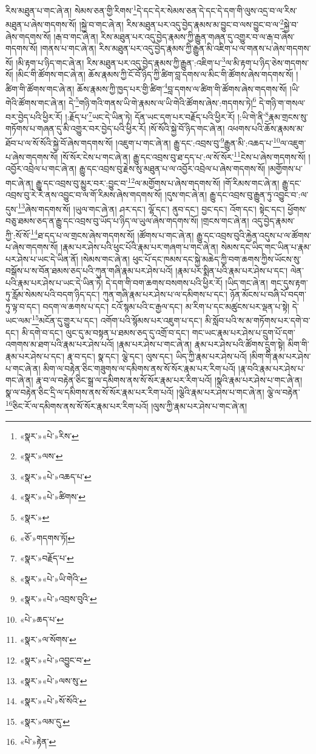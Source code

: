 རིས་མཐུན་པ་གང་ཞེ་ན། སེམས་ཅན་གྱི་རིགས་\footnote{«སྣར་»«པེ་»རིས་}དེ་དང་དེར་སེམས་ཅན་དེ་དང་དེ་དག་གི་ལུས་འདྲ་བ་ལ་རིས་མཐུན་པ་ཞེས་གདགས་སོ། །སྐྱེ་བ་གང་ཞེ་ན། རིས་མཐུན་པར་འདུ་བྱེད་རྣམས་མ་བྱུང་བ་ལས་བྱུང་བ་ལ་\footnote{«སྣར་»ལས་}སྐྱེ་བ་ཞེས་གདགས་སོ། །རྒ་བ་གང་ཞེ་ན། རིས་མཐུན་པར་འདུ་བྱེད་རྣམས་ཀྱི་རྒྱུན་གཞན་དུ་འགྱུར་བ་ལ་རྒ་བ་ཞེས་གདགས་སོ། །གནས་པ་གང་ཞེ་ན། རིས་མཐུན་པར་འདུ་བྱེད་རྣམས་ཀྱི་རྒྱུན་མི་འཇིག་པ་ལ་གནས་པ་ཞེས་གདགས་སོ། །མི་རྟག་པ་ཉིད་གང་ཞེ་ན། རིས་མཐུན་པར་འདུ་བྱེད་རྣམས་ཀྱི་རྒྱུན་:འཇིག་པ་\footnote{«སྣར་»«པེ་»འཆད་པ་}ལ་མི་རྟག་པ་ཉིད་ཅེས་གདགས་སོ། །མིང་གི་ཚོགས་གང་ཞེ་ན། ཆོས་རྣམས་ཀྱི་ངོ་བོ་ཉིད་ཀྱི་ཚིག་བླ་དགས་ལ་མིང་གི་ཚོགས་ཞེས་གདགས་སོ། །ཚིག་གི་ཚོགས་གང་ཞེ་ན། ཆོས་རྣམས་ཀྱི་ཁྱད་པར་གྱི་ཚིག་\footnote{«སྣར་»«པེ་»ཚིགས་}བླ་དགས་ལ་ཚིག་གི་ཚོགས་ཞེས་གདགས་སོ། །ཡི་གེའི་ཚོགས་གང་ཞེ་ན། དེ་\footnote{«སྣར་»}གཉི་གའི་གནས་ཡི་གེ་རྣམས་ལ་ཡི་གེའི་ཚོགས་ཞེས་:གདགས་ཏེ།\footnote{«ཅོ་»གདགས་ཏོ།} དེ་གཉི་ག་གསལ་བར་བྱེད་པའི་ཕྱིར་རོ། །:རྗོད་པ་\footnote{«སྣར་»བརྗོད་པ་}ཡང་དེ་ཡིན་ཏེ། དོན་ཡང་དག་པར་བརྗོད་པའི་ཕྱིར་རོ། །:ཡི་གེ་ནི་\footnote{«སྣར་»«པེ་»ཡི་གེའི་}རྣམ་གྲངས་སུ་གཏོགས་པ་གཞན་དུ་མི་འགྱུར་བར་བྱེད་པའི་ཕྱིར་རོ། །སོ་སོའི་སྐྱེ་བོ་ཉིད་གང་ཞེ་ན། འཕགས་པའི་ཆོས་རྣམས་མ་ཐོབ་པ་ལ་སོ་སོའི་སྐྱེ་བོ་ཞེས་གདགས་སོ། །འཇུག་པ་གང་ཞེ་ན། རྒྱུ་དང་:འབྲས་བུ་\footnote{«སྣར་»«པེ་»འབྲས་བུའི་}རྒྱུན་མི་:འཆད་པ་\footnote{«པེ་»ཆད་པ་}ལ་འཇུག་པ་ཞེས་གདགས་སོ། །སོ་སོར་ངེས་པ་གང་ཞེ་ན། རྒྱུ་དང་འབྲས་བུ་ཐ་དད་པ་:ལ་སོ་སོར་\footnote{«སྣར་»ལ་སོགས་}ངེས་པ་ཞེས་གདགས་སོ། །འབྱོར་འབྲེལ་པ་གང་ཞེ་ན། རྒྱུ་དང་འབྲས་བུ་རྗེས་སུ་མཐུན་པ་ལ་འབྱོར་འབྲེལ་པ་ཞེས་གདགས་སོ། །མགྱོགས་པ་གང་ཞེ་ན། རྒྱུ་དང་འབྲས་བུ་མྱུར་བར་:བྱུང་བ་\footnote{«སྣར་»«པེ་»འབྱུང་བ་}ལ་མགྱོགས་པ་ཞེས་གདགས་སོ། །གོ་རིམས་གང་ཞེ་ན། རྒྱུ་དང་འབྲས་བུ་རེ་རེ་ནས་འབྱུང་བ་ལ་གོ་རིམས་ཞེས་གདགས་སོ། །དུས་གང་ཞེ་ན། རྒྱུ་དང་འབྲས་བུ་རྒྱུན་ཏུ་འབྱུང་བ་:ལ་དུས་\footnote{«སྣར་»«པེ་»ལས་སུ་}ཞེས་གདགས་སོ། །ཡུལ་གང་ཞེ་ན། ཤར་དང་། ལྷོ་དང་། ནུབ་དང་། བྱང་དང་། འོག་དང་། སྟེང་དང་། ཕྱོགས་བཅུ་ཐམས་ཅད་ན་རྒྱུ་དང་འབྲས་བུ་ཡོད་པ་ཉིད་ལ་ཡུལ་ཞེས་གདགས་སོ། །གྲངས་གང་ཞེ་ན། འདུ་བྱེད་རྣམས་ཀྱི་:སོ་སོ་\footnote{«སྣར་»«པེ་»སོ་སོའི་}ཐ་དད་པ་ལ་གྲངས་ཞེས་གདགས་སོ། །ཚོགས་པ་གང་ཞེ་ན། རྒྱུ་དང་འབྲས་བུའི་རྐྱེན་འདུས་པ་ལ་ཚོགས་པ་ཞེས་གདགས་སོ། །རྣམ་པར་ཤེས་པའི་ཕུང་པོའི་རྣམ་པར་གཞག་པ་གང་ཞེ་ན། སེམས་དང་ཡིད་གང་ཡིན་པ་རྣམ་པར་ཤེས་པ་ཡང་དེ་ཡིན་ནོ། །སེམས་གང་ཞེ་ན། ཕུང་པོ་དང་ཁམས་དང་སྐྱེ་མཆེད་ཀྱི་བག་ཆགས་ཀྱིས་ཡོངས་སུ་བསྒོས་པ་ས་བོན་ཐམས་ཅད་པའི་ཀུན་གཞི་རྣམ་པར་ཤེས་པའོ། །རྣམ་པར་སྨིན་པའི་རྣམ་པར་ཤེས་པ་དང་། ལེན་པའི་རྣམ་པར་ཤེས་པ་ཡང་དེ་ཡིན་ཏེ། དེ་དག་གི་བག་ཆགས་བསགས་པའི་ཕྱིར་རོ། །ཡིད་གང་ཞེ་ན། གང་དུས་རྟག་ཏུ་རློམ་སེམས་པའི་བདག་ཉིད་དང་། ཀུན་གཞི་རྣམ་པར་ཤེས་པ་ལ་དམིགས་པ་དང་། ཉོན་མོངས་པ་བཞི་པོ་བདག་ཏུ་ལྟ་བ་དང་། བདག་ལ་ཆགས་པ་དང་། ངའོ་སྙམ་པའི་ང་རྒྱལ་དང་། མ་རིག་པ་དང་མཚུངས་པར་ལྡན་པ་སྟེ། དེ་ཡང་ལམ་\footnote{«སྣར་»ལམ་དུ་}མངོན་དུ་གྱུར་པ་དང་། འགོག་པའི་སྙོམས་པར་འཇུག་པ་དང་། མི་སློབ་པའི་ས་མ་གཏོགས་པར་དགེ་བ་དང་། མི་དགེ་བ་དང་། ལུང་དུ་མ་བསྟན་པ་ཐམས་ཅད་དུ་འགྲོ་བ་དང་། གང་ཡང་རྣམ་པར་ཤེས་པ་དྲུག་པོ་དག་འགགས་མ་ཐག་པའི་རྣམ་པར་ཤེས་པའོ། །རྣམ་པར་ཤེས་པ་གང་ཞེ་ན། རྣམ་པར་ཤེས་པའི་ཚོགས་དྲུག་སྟེ། མིག་གི་རྣམ་པར་ཤེས་པ་དང་། རྣ་བ་དང་། སྣ་དང་། ལྕེ་དང་། ལུས་དང་། ཡིད་ཀྱི་རྣམ་པར་ཤེས་པའོ། །མིག་གི་རྣམ་པར་ཤེས་པ་གང་ཞེ་ན། མིག་ལ་བརྟེན་ཅིང་གཟུགས་ལ་དམིགས་ནས་སོ་སོར་རྣམ་པར་རིག་པའོ། །རྣ་བའི་རྣམ་པར་ཤེས་པ་གང་ཞེ་ན། རྣ་བ་ལ་བརྟེན་ཅིང་སྒྲ་ལ་དམིགས་ནས་སོ་སོར་རྣམ་པར་རིག་པའོ། །སྣའི་རྣམ་པར་ཤེས་པ་གང་ཞེ་ན། སྣ་ལ་བརྟེན་ཅིང་དྲི་ལ་དམིགས་ནས་སོ་སོར་རྣམ་པར་རིག་པའོ། །ལྕེའི་རྣམ་པར་ཤེས་པ་གང་ཞེ་ན། ལྕེ་ལ་བརྟེན་\footnote{«པེ་»རྟེན་}ཅིང་རོ་ལ་དམིགས་ནས་སོ་སོར་རྣམ་པར་རིག་པའོ། །ལུས་ཀྱི་རྣམ་པར་ཤེས་པ་གང་ཞེ་ན། 